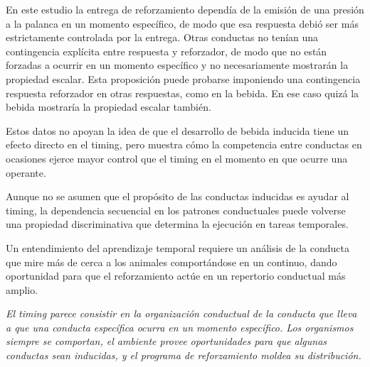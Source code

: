 \documentclass[a4paper,12pt]{article}
\begin{document}
En este estudio la entrega de reforzamiento dependía de la emisión de una presión a la palanca en un momento específico, de modo que esa respuesta debió ser más estrictamente controlada por la entrega. Otras conductas no tenían una contingencia explícita entre respuesta y reforzador, de modo que no están forzadas a ocurrir en un momento específico y no necesariamente mostrarán la propiedad escalar. Esta proposición puede probarse imponiendo una contingencia respuesta reforzador en otras respuestas, como en la bebida. En ese caso quizá la bebida mostraría la propiedad escalar también.

Estos datos no apoyan la idea de que el desarrollo de bebida inducida tiene un efecto directo en el timing, pero muestra cómo la competencia entre conductas en ocasiones ejerce mayor control que el timing en el momento en que ocurre una operante. 

Aunque no se asumen que el propósito de las conductas inducidas es ayudar al timing, la dependencia secuencial en los patrones conductuales puede volverse una propiedad discriminativa que determina la ejecución en tareas temporales.

Un entendimiento del aprendizaje temporal requiere un análisis de la conducta que mire más de cerca a los animales comportándose en un continuo, dando oportunidad para que el reforzamiento actúe en un repertorio conductual más amplio.

{\itshape El timing parece consistir en la organización conductual de la conducta que lleva a que una conducta específica ocurra en un momento específico. Los organismos siempre se comportan, el ambiente provee oportunidades para que algunas conductas sean inducidas, y el programa de reforzamiento moldea su distribución.}
\end{document}
